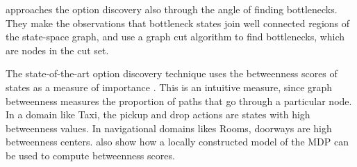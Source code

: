 \citet{Menache2002} approaches the option discovery also through the
angle of finding bottlenecks. They make the observations that bottleneck
states join well connected regions of the state-space graph, and use
a graph cut algorithm to find bottlenecks, which are nodes in the cut set. 

The state-of-the-art option discovery technique uses the betweenness
scores of states as a measure of importance \citep{Simsek2008}. This is
an intuitive measure, since graph betweenness measures the proportion of
paths that go through a particular node. In a domain like Taxi, the
pickup and drop actions are states with high betweenness values. In
navigational domains likes Rooms, doorways are high betweenness centers.
\citet{Simsek2008} also show how a locally constructed model of the MDP
can be used to compute betweenness scores.

